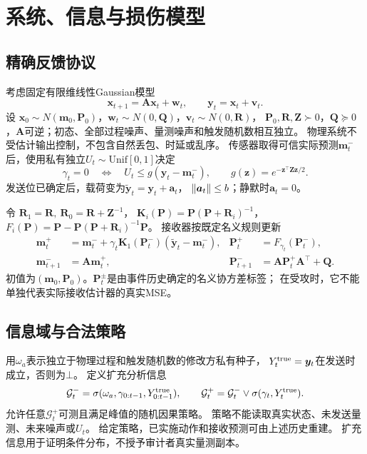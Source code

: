 \section{系统、信息与损伤模型}
\subsection{精确反馈协议}
考虑固定有限维线性Gaussian模型
\begin{equation}
{\bm{x}}_{t+1}={\bm{A}}{\bm{x}}_t+{\bm{w}}_t,\qquad {\bm{y}}_t={\bm{x}}_t+{\bm{v}}_t .
\label{eq:model}
\end{equation}
设 ${\bm{x}}_0\sim N({\bm{m}}_0,{\bm{P}}_0)$，${\bm{w}}_t\sim N(0,{\bm{Q}})$，${\bm{v}}_t\sim N(0,{\bm{R}})$，
${\bm{P}}_0,{\bm{R}},{\bm{Z}}\succ0$，${\bm{Q}}\succeq0$，${\bm{A}}$可逆；初态、全部过程噪声、量测噪声和触发随机数相互独立。
物理系统不受估计输出控制，不包含自然丢包、时延或乱序。
传感器取得可信实际预测${\bm{m}}_t^-$后，使用私有独立$U_t\sim\mathrm{Unif}[0,1]$决定
\begin{equation}
\gamma_t=0\quad\Longleftrightarrow\quad
U_t\le g({\bm{y}}_t-{\bm{m}}_t^-),\qquad g({\bm{z}})=e^{-{\bm{z}}^\top {\bm{Z}}{\bm{z}}/2}.
\label{eq:trigger}
\end{equation}
发送位已确定后，载荷变为$\tilde {\bm{y}}_t={\bm{y}}_t+{\bm{a}}_t$，
$\left\|{\bm{a}}_t\right\|\le b$；静默时${\bm{a}}_t=0$。

令 ${\bm{R}}_1={\bm{R}},\ {\bm{R}}_0={\bm{R}}+{\bm{Z}}^{-1}$，
${\bm{K}}_i({\bm{P}})={\bm{P}}({\bm{P}}+{\bm{R}}_i)^{-1}$，$F_i({\bm{P}})={\bm{P}}-{\bm{P}}({\bm{P}}+{\bm{R}}_i)^{-1}{\bm{P}}$。
接收器按既定名义规则更新
\begin{align}
{\bm{m}}_t^+&={\bm{m}}_t^-+\gamma_t{\bm{K}}_1({\bm{P}}_t^-)(\tilde {\bm{y}}_t-{\bm{m}}_t^-),&
{\bm{P}}_t^+&=F_{\gamma_t}({\bm{P}}_t^-),\label{eq:receive}\\
{\bm{m}}_{t+1}^-&={\bm{A}}{\bm{m}}_t^+,& {\bm{P}}_{t+1}^-&={\bm{A}}{\bm{P}}_t^+{\bm{A}}^\top+{\bm{Q}}.\nonumber
\end{align}
初值为$({\bm{m}}_0,{\bm{P}}_0)$。${\bm{P}}_t^\pm$是由事件历史确定的名义协方差标签；
在受攻时，它不能单独代表实际接收估计器的真实MSE。

\subsection{信息域与合法策略}
用$\omega_a$表示独立于物理过程和触发随机数的修改方私有种子，
$Y_t^{\rm true}={\bm{y}}_t$在发送时成立，否则为$\bot$。
定义扩充分析信息
\[
\mathcal G_t^-=\sigma(\omega_a,\gamma_{0:t-1},Y^{\rm true}_{0:t-1}),\qquad
\mathcal G_t^+=\mathcal G_t^-\vee\sigma(\gamma_t,Y_t^{\rm true}).
\]
允许任意$\mathcal G_t^+$可测且满足峰值的随机因果策略。
策略不能读取真实状态、未发送量测、未来噪声或$U_t$。
给定策略，已实施动作和接收预测可由上述历史重建。
扩充信息用于证明条件分布，不授予审计者真实量测副本。

